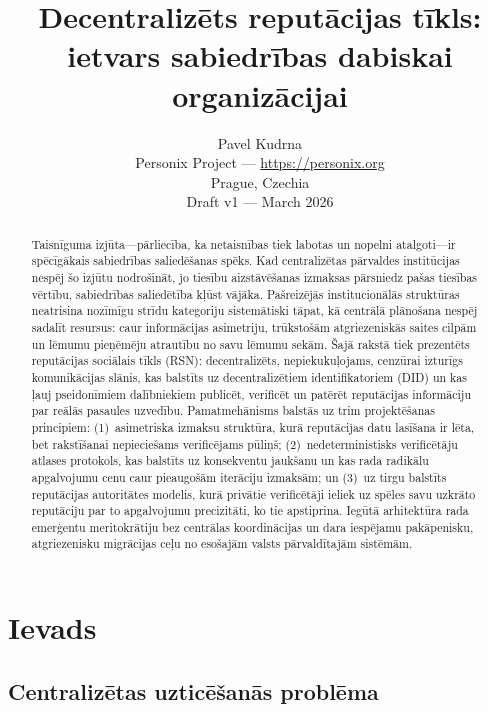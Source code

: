 \documentclass[11pt,a4paper,twocolumn]{article}
\title{\textbf{Decentralizēts reputācijas tīkls:\\ietvars sabiedrības dabiskai organizācijai}}
\author{Pavel Kudrna\\Personix Project --- \url{https://personix.org}\\Prague, Czechia\\Draft v1 --- March 2026}
\date{}
\begin{document}
\maketitle

\begin{abstract}
Taisnīguma izjūta---pārliecība, ka netaisnības tiek labotas un nopelni atalgoti---ir spēcīgākais sabiedrības saliedēšanas spēks. Kad centralizētas pārvaldes institūcijas nespēj šo izjūtu nodrošināt, jo tiesību aizstāvēšanas izmaksas pārsniedz pašas tiesības vērtību, sabiedrības saliedētība kļūst vājāka. Pašreizējās institucionālās struktūras neatrisina nozīmīgu strīdu kategoriju sistemātiski tāpat, kā centrālā plānošana nespēj sadalīt resursus: caur informācijas asimetriju, trūkstošām atgriezeniskās saites cilpām un lēmumu pieņēmēju atrautību no savu lēmumu sekām. Šajā rakstā tiek prezentēts reputācijas sociālais tīkls (RSN): decentralizēts, nepiekukuļojams, cenzūrai izturīgs komunikācijas slānis, kas balstīts uz decentralizētiem identifikatoriem (DID) un kas ļauj pseidonīmiem dalībniekiem publicēt, verificēt un patērēt reputācijas informāciju par reālās pasaules uzvedību. Pamatmehānisms balstās uz trim projektēšanas principiem: (1)~asimetriska izmaksu struktūra, kurā reputācijas datu lasīšana ir lēta, bet rakstīšanai nepieciešams verificējams pūliņš; (2)~nedeterministisks verificētāju atlases protokols, kas balstīts uz konsekventu jaukšanu un kas rada radikālu apgalvojumu cenu caur pieaugošām iterāciju izmaksām; un (3)~uz tirgu balstīts reputācijas autoritātes modelis, kurā privātie verificētāji ieliek uz spēles savu uzkrāto reputāciju par to apgalvojumu precizitāti, ko tie apstiprina. Iegūtā arhitektūra rada emerģentu meritokrātiju bez centrālas koordinācijas un dara iespējamu pakāpenisku, atgriezenisku migrācijas ceļu no esošajām valsts pārvaldītajām sistēmām.
\end{abstract}

\section{Ievads}

\subsection{Centralizētas uzticēšanās problēma}
\end{document}
